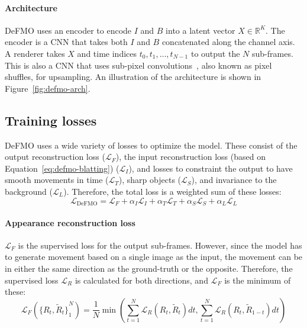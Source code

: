 \paragraph{Architecture}
DeFMO uses an encoder to encode $I$ and $B$ into a latent vector $X \in \mathbb{R}^K$.
The encoder is a CNN that takes both $I$ and $B$ concatenated along the channel axis.
A renderer takes $X$ and time indices $t_0, t_1, \ldots, t_{N-1}$ to output the $N$ sub-frames.
This is also a CNN that uses sub-pixel convolutions~\citep{pixelshuffle}, also known as pixel shuffles, for upsampling.
An illustration of the architecture is shown in Figure~\ref{fig:defmo-arch}.

\subsection{Training losses}
    DeFMO uses a wide variety of losses to optimize the model.
    These consist of the output reconstruction loss ($\mathcal{L}_F$), the input reconstruction loss (based on Equation~\ref{eq:defmo-blatting}) ($\mathcal{L}_I$), and losses to constraint the output to have smooth movements in time ($\mathcal{L}_T$), sharp objects ($\mathcal{L}_S$), and invariance to the background ($\mathcal{L}_L$).
    Therefore, the total loss is a weighted sum of these losses:
    \begin{equation}
        \mathcal{L}_{\mathrm{DeFMO}} = \mathcal{L}_F + \alpha_I \mathcal{L}_I + \alpha_T \mathcal{L}_T + \alpha_S \mathcal{L}_S + \alpha_L \mathcal{L}_L
    \end{equation}

    \paragraph{Appearance reconstruction loss}
    $\mathcal{L}_F$ is the supervised loss for the output sub-frames.
    However, since the model has to generate movement based on a single image as the input, the movement can be in either the same direction as the ground-truth or the opposite.
    Therefore, the supervised loss $\mathcal{L}_R$ is calculated for both directions, and $\mathcal{L}_F$ is the minimum of these:
    \begin{equation}
        \mathcal{L}_F({\{ R_t, \tilde{R}_t \}}_1^N) = \frac{1}{N} \min \left( \sum_{t=1}^N \mathcal{L}_R(R_t, \tilde{R}_t) dt, \sum_{t=1}^N \mathcal{L}_R(R_t, \tilde{R}_{1-t}) dt \right)
    \end{equation}

